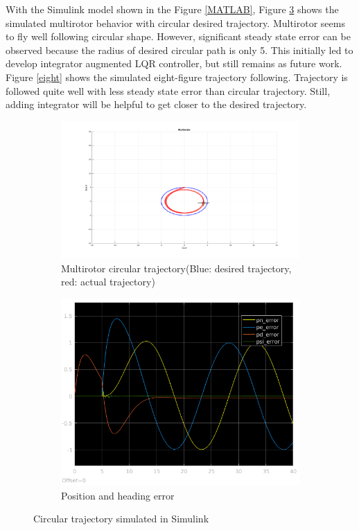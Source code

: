 \documentclass{article}
\begin{document}
With the Simulink model shown in the Figure \ref{MATLAB}, Figure \ref{circle} shows the simulated multirotor behavior with circular desired trajectory. Multirotor seems to fly well following circular shape. However, significant steady state error can be observed because the radius of desired circular path is only 5. This initially led to develop integrator augmented LQR controller, but still remains as future work. Figure \ref{eight} shows the simulated eight-figure trajectory following. Trajectory is followed quite well with less steady state error than circular trajectory. Still, adding integrator will be helpful to get closer to the desired trajectory.

\begin{figure}[h!]
	\centering
	\begin{subfigure}{.5\textwidth}
		\centering
		\includegraphics[width=0.9\linewidth]{simulink1.png}
		\caption{Multirotor circular trajectory(Blue: desired trajectory, red: actual trajectory)}
		\label{simulink1}
	\end{subfigure}%
	\begin{subfigure}{.5\textwidth}
		\centering
		\includegraphics[width=0.7\linewidth]{simulink2.png}
		\caption{Position and heading error}
		\label{simulink2}
	\end{subfigure}
	\caption{Circular trajectory simulated in Simulink}
	\label{circle}
\end{figure}
\end{document}
